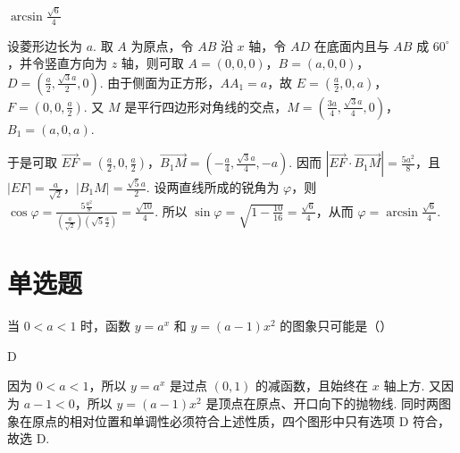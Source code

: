 \documentclass[UTF8,a4paper,oneside,11pt]{ctexbook}
\begin{document}
\begin{answer}
\(\arcsin \frac{\sqrt{6}}{4}\)
\end{answer}

\begin{solution}
设菱形边长为 \(a\). 取 \(A\) 为原点，令 \(AB\) 沿 \(x\) 轴，令 \(AD\) 在底面内且与 \(AB\) 成 \(60^\circ\)，并令竖直方向为 \(z\) 轴，则可取 \(A=(0,0,0)\)，\(B=(a,0,0)\)，\(D=\left(\frac{a}{2},\frac{\sqrt{3}a}{2},0\right)\). 由于侧面为正方形，\(AA_1=a\)，故 \(E=\left(\frac{a}{2},0,a\right)\)，\(F=\left(0,0,\frac{a}{2}\right)\). 又 \(M\) 是平行四边形对角线的交点，\(M=\left(\frac{3a}{4},\frac{\sqrt{3}a}{4},0\right)\)，\(B_1=(a,0,a)\).

于是可取 \(\overrightarrow{EF}=\left(\frac{a}{2},0,\frac{a}{2}\right)\)，\(\overrightarrow{B_1M}=\left(-\frac{a}{4},\frac{\sqrt{3}a}{4},-a\right)\). 因而 \(\left|\overrightarrow{EF}\cdot\overrightarrow{B_1M}\right|=\frac{5a^2}{8}\)，且 \(|EF|=\frac{a}{\sqrt{2}}\)，\(|B_1M|=\frac{\sqrt{5}a}{2}\). 设两直线所成的锐角为 \(\varphi\)，则 \(\cos\varphi=\frac{5\frac{a^2}{8}}{(\frac{a}{\sqrt{2}})(\sqrt{5}\frac{a}{2})}=\frac{\sqrt{10}}{4}\). 所以 \(\sin\varphi=\sqrt{1-\frac{10}{16}}=\frac{\sqrt{6}}{4}\)，从而 \(\varphi=\arcsin\frac{\sqrt{6}}{4}\).
\end{solution}

\section{单选题}

\begin{problem}
当 \(0 < a < 1\) 时，函数 \(y = a^x\) 和 \(y = (a - 1)x^2\) 的图象只可能是（\quad）

\choices
    {}
    {}
    {}
    {}
\end{problem}

\begin{answer}
D
\end{answer}

\begin{solution}
因为 \(0<a<1\)，所以 \(y=a^x\) 是过点 \((0,1)\) 的减函数，且始终在 \(x\) 轴上方. 又因为 \(a-1<0\)，所以 \(y=(a-1)x^2\) 是顶点在原点、开口向下的抛物线. 同时两图象在原点的相对位置和单调性必须符合上述性质，四个图形中只有选项 D 符合，故选 D.
\end{solution}
\end{document}
